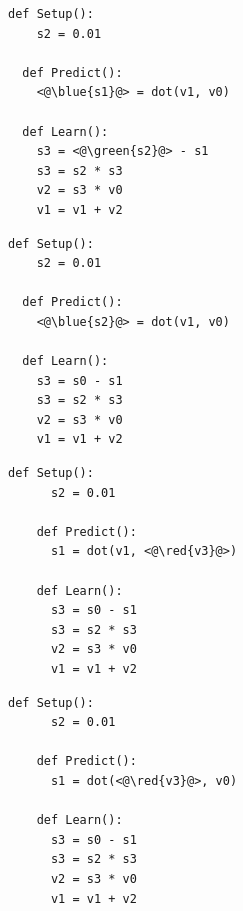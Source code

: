 \documentclass[11pt,oneside,openany,report]{jsbook}
\newcommand{\red}[1]{\textcolor{red}{#1}}
\newcommand{\green}[1]{\textcolor[rgb]{0.1,0.6,0.1}{\textbf{#1}}}
\newcommand{\blue}[1]{\textcolor[rgb]{0.1,0.1,1}{\textbf{#1}}}
\begin{document}
\begin{multicols}{2}

  \begin{lstlisting}[caption=妥当な機械学習アルゴリズムの例,label=code:valid_algorithm]
  def Setup():
    s2 = 0.01

  def Predict():
    <@\blue{s1}@> = dot(v1, v0)

  def Learn():
    s3 = <@\green{s2}@> - s1
    s3 = s2 * s3
    v2 = s3 * v0
    v1 = v1 + v2
  \end{lstlisting}

  \columnbreak

  \begin{lstlisting}[caption=Predict関数の中で予測ラベル$s1$に代入が行われておらず\, 妥当ではないアルゴリズムの例. 妥当なアルゴリズムCode. \ref{code:valid_algorithm}との差分を赤字で示す. ,label=code:invalid_algorithm_1]
  def Setup():
    s2 = 0.01

  def Predict():
    <@\blue{s2}@> = dot(v1, v0)

  def Learn():
    s3 = s0 - s1
    s3 = s2 * s3
    v2 = s3 * v0
    v1 = v1 + v2
\end{lstlisting}
\end{multicols}

\newpage

\begin{multicols}{2}
  \begin{lstlisting}[caption=Predict関数の中で代入される予測ラベル$s1$の値がPredict関数実行前に代入される入力ベクトル$v0$に依存しておらず\, 妥当ではないアルゴリズムの例. 妥当なアルゴリズムCode. \ref{code:valid_algorithm}との差分を赤字で示す. ,label=code:invalid_algorithm_2]
    def Setup():
      s2 = 0.01

    def Predict():
      s1 = dot(v1, <@\red{v3}@>)

    def Learn():
      s3 = s0 - s1
      s3 = s2 * s3
      v2 = s3 * v0
      v1 = v1 + v2
  \end{lstlisting}

  \columnbreak

  \begin{lstlisting}[caption=Predict関数の中で代入される予測ラベル$s1$がLearn関数で更新されている学習対象のパラメータ$v1$に依存して依存しておらず\, 妥当ではないアルゴリズムの例. 妥当なアルゴリズムCode. \ref{code:valid_algorithm}との差分を赤字で示す. ,label=code:invalid_algorithm_3]
    def Setup():
      s2 = 0.01

    def Predict():
      s1 = dot(<@\red{v3}@>, v0)

    def Learn():
      s3 = s0 - s1
      s3 = s2 * s3
      v2 = s3 * v0
      v1 = v1 + v2
  \end{lstlisting}
\end{multicols}
\end{document}
